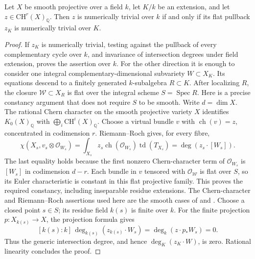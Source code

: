 \begin{lemma}\label{B:num-basechange}
Let $X$ be smooth projective over a field $k$, let $K/k$ be an extension, and let $z\in\mathrm{CH}^r(X)_{\mathbb Q}$. Then $z$ is numerically trivial over $k$ if and only if its flat pullback $z_K$ is numerically trivial over $K$.
\end{lemma}
\begin{proof}
If $z_K$ is numerically trivial, testing against the pullback of every complementary cycle over $k$, and invariance of intersection degrees under field extension, proves the assertion over $k$.
For the other direction it is enough to consider one integral complementary-dimensional subvariety $W\subset X_K$. Its equations descend to a finitely generated $k$-subalgebra $R\subset K$. After localizing $R$, the closure $\mathcal W\subset X_R$ is flat over the integral scheme $S=\operatorname{Spec}R$. Here is a precise constancy argument that does not require $S$ to be smooth. Write $d=\dim X$. The rational Chern character on the smooth projective variety $X$ identifies $K_0(X)_{\mathbb Q}$ with $\bigoplus_i\mathrm{CH}^i(X)_{\mathbb Q}$. Choose a virtual bundle $v$ with $\operatorname{ch}(v)=z$, concentrated in codimension $r$. Riemann--Roch gives, for every fibre,
\[
 \chi(X_s,v_s\otimes\mathcal O_{W_s})
 =\int_{X_s}z_s\operatorname{ch}(\mathcal O_{W_s})\operatorname{td}(T_{X_s})
 =\deg(z_s\cdot[W_s]).
\]
The last equality holds because the first nonzero Chern-character term of $\mathcal O_{W_s}$ is $[W_s]$ in codimension $d-r$. Each bundle in $v$ tensored with $\mathcal O_{\mathcal W}$ is flat over $S$, so its Euler characteristic is constant in this flat projective family. This proves the required constancy, including inseparable residue extensions. The Chern-character and Riemann--Roch assertions used here are the smooth cases of \cite[\S3.3]{BFulton1975} and \cite[\S0 and Chapter III, \S1]{BBFM1975}. Choose a closed point $s\in S$; its residue field $k(s)$ is finite over $k$. For the finite projection $p:X_{k(s)}\to X$, the projection formula gives
\[
 [k(s):k]\,\deg_{k(s)}(z_{k(s)}\cdot W_s)
  =\deg_k(z\cdot p_*W_s)=0.
\]
Thus the generic intersection degree, and hence $\deg_K(z_K\cdot W)$, is zero. Rational linearity concludes the proof.
\end{proof}

